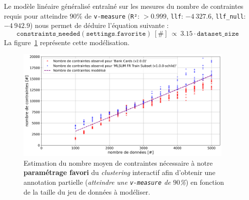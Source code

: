 			Le modèle linéaire généralisé entraîné sur les mesures du nombre de contraintes requis pour atteindre $90$\% de \texttt{v-measure} (\texttt{R²}: $> 0.999$, \texttt{llf}: $-4~327.6$, \texttt{llf\_null}: $-4~942.9$) nous permet de déduire l'équation suivante :
			\begin{equation}
				\label{equation:4.3.3-ETUDE-COUT-NOMBRE-CONTRAINTES}
				\texttt{constraints\_needed}(\texttt{settings.favorite})~[\#]~
				\propto~3.15 \cdot \texttt{dataset\_size}
			\end{equation}
			La figure~\ref{figure:4.3.3-ETUDE-COUT-NOMBRE-CONTRAINTES} représente cette modélisation.
			\newline
			\begin{figure}[!htb]
				\centering
				\includegraphics[width=0.95\textwidth]{figures/etude-nombre-contraintes-1-modelisation-nombre}
				\caption{Estimation du nombre moyen de contraintes nécessaire à notre \textbf{paramétrage favori} du \textit{clustering} interactif afin d'obtenir une annotation partielle (\textit{atteindre une \texttt{v-measure} de $90$\%}) en fonction de la taille du jeu de données à modéliser.}
				\label{figure:4.3.3-ETUDE-COUT-NOMBRE-CONTRAINTES}
			\end{figure}
		
